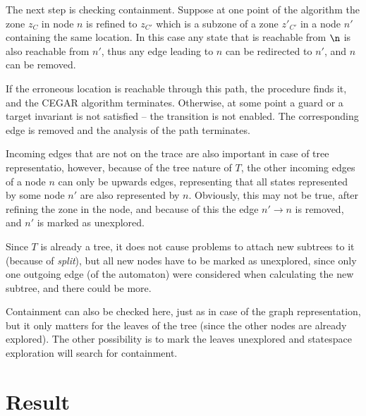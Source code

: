 The next step is checking containment. Suppose at one point of the
algorithm the zone $z_{C}$ in node $n$ %
 is 
refined to  $z_{C'}$ which is a
subzone of a zone $z'_{C'}$ in a node $n'$ containing the same location. In this case any state that is reachable from $\n$ is also reachable from $n'$, thus any edge leading to  $n$ can be redirected to $n'$, and $n$ can be removed.

If the erroneous location is reachable through this path, the procedure finds it,
and the CEGAR algorithm terminates. Otherwise, at some point a guard or a target invariant
is not satisfied -- the transition is not enabled. The corresponding edge is removed and the analysis of the path terminates.


Incoming edges that are not on the trace are also important in case of tree representatio, however, because of the tree nature of $T$, the other incoming edges of a node $n$ can only be upwards edges, representing that all states represented by some node $n'$ are also represented by $n$. Obviously, this may not be true, after refining the zone in the node, and because of this the edge $n' \to n$ is removed, and $n'$ is marked as unexplored.

Since $T$ is already a tree, it does not cause problems to attach new subtrees to it (because of \emph{split}), but all new nodes have to be marked as unexplored, since only one outgoing edge (of the automaton) were considered when calculating the new subtree, and there could be more.

Containment can also be checked here, just as in case of the graph representation, but it only matters for the leaves of the tree (since the other nodes are already explored). The other possibility is to mark the leaves unexplored and statespace exploration will search for containment.

   






\section{Result}

